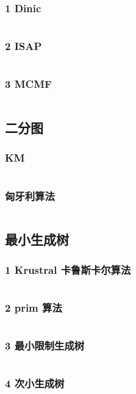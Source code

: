\documentclass{article}
\begin{document}
\subsubsection{1 Dinic}
\inputminted{c++}{/home/zzuzxy/t2/Template1.0/3 图论/Maxflow/1 Dinic.cpp}
\subsubsection{2 ISAP}
\inputminted{c++}{/home/zzuzxy/t2/Template1.0/3 图论/Maxflow/2 ISAP.cpp}
\subsubsection{3 MCMF}
\inputminted{c++}{/home/zzuzxy/t2/Template1.0/3 图论/Maxflow/3 MCMF.cpp}
\subsection{二分图}
\subsubsection{KM}
\inputminted{c++}{/home/zzuzxy/t2/Template1.0/3 图论/二分图/KM.cpp}
\subsubsection{匈牙利算法}
\inputminted{c++}{/home/zzuzxy/t2/Template1.0/3 图论/二分图/匈牙利算法.cpp}
\subsection{最小生成树}
\subsubsection{1 Krustral 卡鲁斯卡尔算法}
\inputminted{c++}{/home/zzuzxy/t2/Template1.0/3 图论/最小生成树/1 Krustral 卡鲁斯卡尔算法.cpp}
\subsubsection{2 prim 算法}
\inputminted{c++}{/home/zzuzxy/t2/Template1.0/3 图论/最小生成树/2 prim 算法.cpp}
\subsubsection{3 最小限制生成树}
\inputminted{c++}{/home/zzuzxy/t2/Template1.0/3 图论/最小生成树/3 最小限制生成树.cpp}
\subsubsection{4 次小生成树}
\inputminted{c++}{/home/zzuzxy/t2/Template1.0/3 图论/最小生成树/4 次小生成树.cpp}
\end{document}
